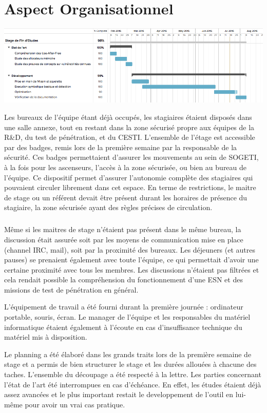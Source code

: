 \section*{Aspect Organisationnel}
\begin{center}
\includegraphics[scale=0.5]{gant.png}\newline
\end{center}

Les bureaux de l'équipe étant déjà occupés, les stagiaires étaient disposés dans une salle annexe, tout en restant dans la zone sécurisé propre aux équipes de la R\&D, du test de pénétration,
et du CESTI. L'ensemble de l'étage est accessible par des badges, remis lors de la première semaine par la responsable de la sécurité. Ces badges permettaient d'assurer les mouvements au sein
de SOGETI, à la fois pour les ascenseurs, l'accès à la zone sécurisée, ou bien au bureau de l'équipe. Ce dispositif permet d'assurer l'autonomie complète des stagiaires qui pouvaient circuler
librement dans cet espace. En terme de restrictions, le maitre de stage ou un référent devait être présent durant les horaires de présence du stagiaire, la zone sécurisée ayant des règles précises de circulation.
\subparagraph{}
Même si les maitres de stage n'étaient pas présent dans le même bureau, la discussion était assurée soit par les moyens de communication mise en place (channel IRC, mail), soit par la proximité des
bureaux. Les déjeuners (et autres pauses) se prenaient également avec toute l'équipe, ce qui permettait d'avoir une certaine proximité avec tous les membres. Les discussions n'étaient pas filtrées et cela rendait possible la compréhension du fonctionnement d'une ESN et des missions de test de pénétration en général.

L'équipement de travail a été fourni durant la première journée : ordinateur portable, souris, écran. Le manager de l'équipe et les responsables du matériel informatique étaient également à l'écoute
en cas d'insuffisance technique du matériel mis à disposition.


Le planning a été élaboré dans les grands traits lors de la première semaine de stage et a permis de bien structurer
le stage et les durées allouées à chacune des taches. L'ensemble du découpage a été respecté à la lettre. Les parties
concernant l'état de l'art été interrompues en cas d'échéance. En effet, les études étaient déjà assez avancées et le plus
important restait le developpement de l'outil en lui-même pour avoir un vrai cas pratique.

